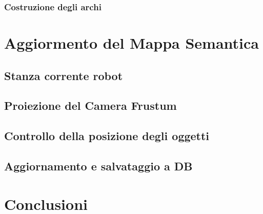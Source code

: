 \subsubsection{Costruzione degli archi}

\section{Aggiormento del Mappa Semantica}
\subsection{Stanza corrente robot}
\subsection{Proiezione del Camera Frustum}
\subsection{Controllo della posizione degli oggetti}
\subsection{Aggiornamento e salvataggio a DB}



\section{Conclusioni}

